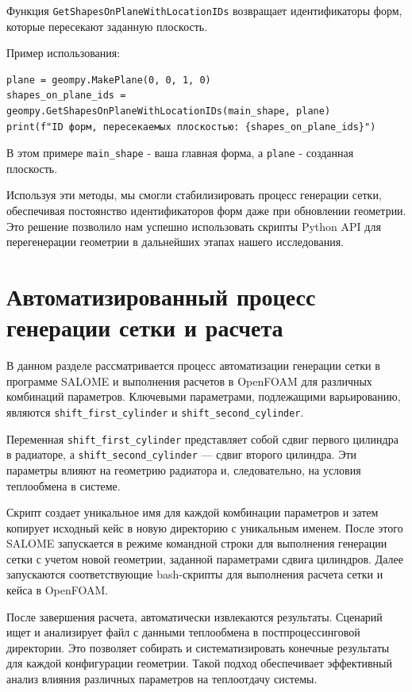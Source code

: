 \documentclass[a4paper,12pt]{article}
\theoremstyle{plain} %
\theoremstyle{definition} %
\theoremstyle{remark} %
\begin{document}
Функция \texttt{GetShapesOnPlaneWithLocationIDs} возвращает идентификаторы форм, которые пересекают заданную плоскость.

Пример использования:
\begin{verbatim}
plane = geompy.MakePlane(0, 0, 1, 0)
shapes_on_plane_ids = geompy.GetShapesOnPlaneWithLocationIDs(main_shape, plane)
print(f"ID форм, пересекаемых плоскостью: {shapes_on_plane_ids}")
\end{verbatim}

В этом примере \texttt{main\_shape} - ваша главная форма, а \texttt{plane} - созданная плоскость.

Используя эти методы, мы смогли стабилизировать процесс генерации сетки, обеспечивая постоянство идентификаторов форм даже при обновлении геометрии. Это решение позволило нам успешно использовать скрипты Python API для перегенерации геометрии в дальнейших этапах нашего исследования.

\section{Автоматизированный процесс генерации сетки и расчета}

В данном разделе рассматривается процесс автоматизации генерации сетки в программе SALOME и выполнения расчетов в OpenFOAM для различных комбинаций параметров. Ключевыми параметрами, подлежащими варьированию, являются \texttt{shift\_first\_cylinder} и \texttt{shift\_second\_cylinder}.

Переменная \texttt{shift\_first\_cylinder} представляет собой сдвиг первого цилиндра в радиаторе, а \texttt{shift\_second\_cylinder} — сдвиг второго цилиндра. Эти параметры влияют на геометрию радиатора и, следовательно, на условия теплообмена в системе.

Скрипт создает уникальное имя для каждой комбинации параметров и затем копирует исходный кейс в новую директорию с уникальным именем. После этого SALOME запускается в режиме командной строки для выполнения генерации сетки с учетом новой геометрии, заданной параметрами сдвига цилиндров. Далее запускаются соответствующие bash-скрипты для выполнения расчета сетки и кейса в OpenFOAM.

После завершения расчета, автоматически извлекаются результаты. Сценарий ищет и анализирует файл с данными теплообмена в постпроцессинговой директории. Это позволяет собирать и систематизировать конечные результаты для каждой конфигурации геометрии. Такой подход обеспечивает эффективный анализ влияния различных параметров на теплоотдачу системы.
\end{document}
